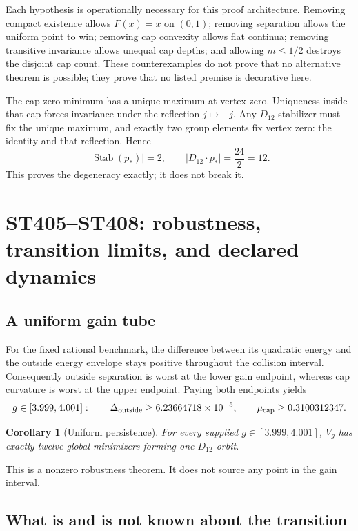\documentclass[11pt,a4paper]{article}
\newtheorem{corollary}{Corollary}
\begin{document}
Each hypothesis is operationally necessary for this proof architecture.  Removing
compact existence allows $F(x)=x$ on $(0,1)$; removing separation allows the uniform
point to win; removing cap convexity allows flat continua; removing transitive
invariance allows unequal cap depths; and allowing $m\le1/2$ destroys the disjoint
cap count.  These counterexamples do not prove that no alternative theorem is
possible; they prove that no listed premise is decorative here.

The cap-zero minimum has a unique maximum at vertex zero.  Uniqueness inside that
cap forces invariance under the reflection $j\mapsto-j$.  Any $D_{12}$ stabilizer
must fix the unique maximum, and exactly two group elements fix vertex zero: the
identity and that reflection.  Hence
\[
 |\operatorname{Stab}(p_*)|=2,
 \qquad |D_{12}\cdot p_*|=\frac{24}{2}=12.
\]
This proves the degeneracy exactly; it does not break it.

\section{ST405--ST408: robustness, transition limits, and declared dynamics}

\subsection{A uniform gain tube}

For the fixed rational benchmark, the difference between its quadratic energy and
the outside energy envelope stays positive throughout the collision interval.
Consequently outside separation is worst at the lower gain endpoint, whereas cap
curvature is worst at the upper endpoint.  Paying both endpoints yields
\[
 g\in[3.999,4.001]:\qquad
 \Delta_{\rm outside}\ge6.23664718\times10^{-5},\qquad
 \mu_{\rm cap}\ge0.3100312347.
\]

\begin{corollary}[Uniform persistence]
For every supplied $g\in[3.999,4.001]$, $V_g$ has exactly twelve global minimizers
forming one $D_{12}$ orbit.
\end{corollary}

This is a nonzero robustness theorem.  It does not source any point in the gain
interval.

\subsection{What is and is not known about the transition}
\end{document}
